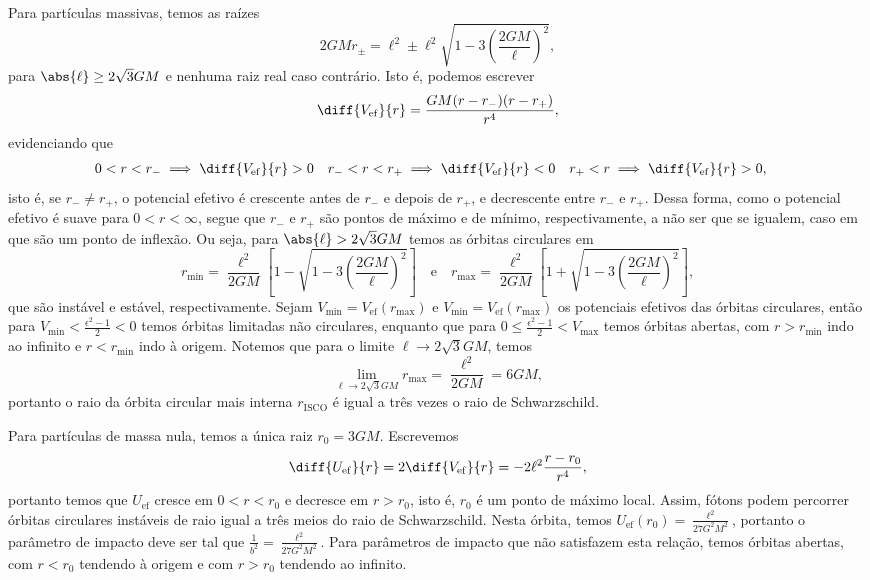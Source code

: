 Para partículas massivas, temos as raízes
\begin{equation*}
    2GM r_{\pm} = \ell^2 \pm \ell^2\sqrt{1 - 3 \left(\frac{2GM}{\ell}\right)^2},
\end{equation*}
para \(\abs{\ell} \geq 2\sqrt{3} GM\) e nenhuma raiz real caso contrário. Isto é, podemos escrever
\begin{equation*}
    \diff{V_\mathrm{ef}}{r} = \frac{GM (r - r_-)(r-r_+)}{r^4},
\end{equation*}
evidenciando que
\begin{align*}
    0 < r < r_- &\implies \diff{V_\mathrm{ef}}{r} > 0& r_- < r < r_+ &\implies \diff{V_\mathrm{ef}}{r} < 0 & r_+ < r &\implies \diff{V_\mathrm{ef}}{r} > 0,
\end{align*}
isto é, se \(r_- \neq r_+\), o potencial efetivo é crescente antes de \(r_-\) e depois de \(r_+\), e decrescente entre \(r_-\) e \(r_+\). Dessa forma, como o potencial efetivo é suave para \(0 < r < \infty\), segue que \(r_-\) e \(r_+\) são pontos de máximo e de mínimo, respectivamente, a não ser que se igualem, caso em que são um ponto de inflexão. Ou seja, para \(\abs{\ell} > 2\sqrt{3}GM\) temos as órbitas circulares em
\begin{equation*}
    r_\mathrm{min} = \frac{\ell^2}{2GM}\left[1 - \sqrt{1 - 3\left(\frac{2GM}{\ell}\right)^2}\right]\quad\text{e}\quad
    r_\mathrm{max} = \frac{\ell^2}{2GM}\left[1 + \sqrt{1 - 3\left(\frac{2GM}{\ell}\right)^2}\right],
\end{equation*}
que são instável e estável, respectivamente. Sejam \(V_\mathrm{min} = V_\mathrm{ef}(r_\mathrm{max})\) e \(V_\mathrm{min} = V_\mathrm{ef}(r_\mathrm{max})\) os potenciais efetivos das órbitas circulares, então para \(V_\mathrm{min} < \frac{\epsilon^2 - 1}{2} < 0\) temos órbitas limitadas não circulares, enquanto que para \(0 \leq \frac{\epsilon^2 - 1}{2} < V_\mathrm{max}\) temos órbitas abertas, com \(r > r_\mathrm{min}\) indo ao infinito e \(r < r_\mathrm{min}\) indo à origem. Notemos que para o limite \(\ell \to 2\sqrt{3}GM\), temos
\begin{equation*}
    \lim_{\ell \to 2\sqrt{3}GM} r_\mathrm{max} = \frac{\ell^2}{2GM} = 6GM,
\end{equation*}
portanto o raio da órbita circular mais interna \(r_\mathrm{ISCO}\) é igual a três vezes o raio de Schwarzschild.

Para partículas de massa nula, temos a única raiz \(r_0 = 3GM\). Escrevemos
\begin{equation*}
    \diff{U_\mathrm{ef}}{r} = 2\diff{V_\mathrm{ef}}{r} = -2\ell^2\frac{r - r_0}{r^4},
\end{equation*}
portanto temos que \(U_\mathrm{ef}\) cresce em \(0 < r < r_0\) e decresce em \(r > r_0\), isto é, \(r_0\) é um ponto de máximo local. Assim, fótons podem percorrer órbitas circulares instáveis de raio igual a três meios do raio de Schwarzschild. Nesta órbita, temos \(U_\mathrm{ef}(r_0) = \frac{\ell^2}{27 G^2M^2}\), portanto o parâmetro de impacto deve ser tal que \(\frac1{b^2} = \frac{\ell^2}{27G^2M^2}\). Para parâmetros de impacto que não satisfazem esta relação, temos órbitas abertas, com \(r < r_0\) tendendo à origem e com \(r > r_0\) tendendo ao infinito.

